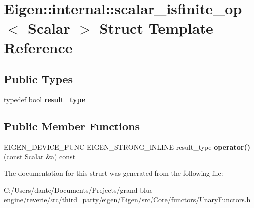 \hypertarget{struct_eigen_1_1internal_1_1scalar__isfinite__op}{}\section{Eigen\+::internal\+::scalar\+\_\+isfinite\+\_\+op$<$ Scalar $>$ Struct Template Reference}
\label{struct_eigen_1_1internal_1_1scalar__isfinite__op}
\subsection*{Public Types}
\begin{DoxyCompactItemize}
\item 
\mbox{\label{struct_eigen_1_1internal_1_1scalar__isfinite__op_a2e842dad628a7c9b2d554f8f1d4a9b55}} 
typedef bool {\bfseries result\+\_\+type}
\end{DoxyCompactItemize}
\subsection*{Public Member Functions}
\begin{DoxyCompactItemize}
\item 
\mbox{\label{struct_eigen_1_1internal_1_1scalar__isfinite__op_aa7b8bc7748af4a93d1096c079b9c61b7}} 
E\+I\+G\+E\+N\+\_\+\+D\+E\+V\+I\+C\+E\+\_\+\+F\+U\+NC E\+I\+G\+E\+N\+\_\+\+S\+T\+R\+O\+N\+G\+\_\+\+I\+N\+L\+I\+NE result\+\_\+type {\bfseries operator()} (const Scalar \&a) const
\end{DoxyCompactItemize}


The documentation for this struct was generated from the following file\+:\begin{DoxyCompactItemize}
\item 
C\+:/\+Users/dante/\+Documents/\+Projects/grand-\/blue-\/engine/reverie/src/third\+\_\+party/eigen/\+Eigen/src/\+Core/functors/Unary\+Functors.\+h\end{DoxyCompactItemize}
